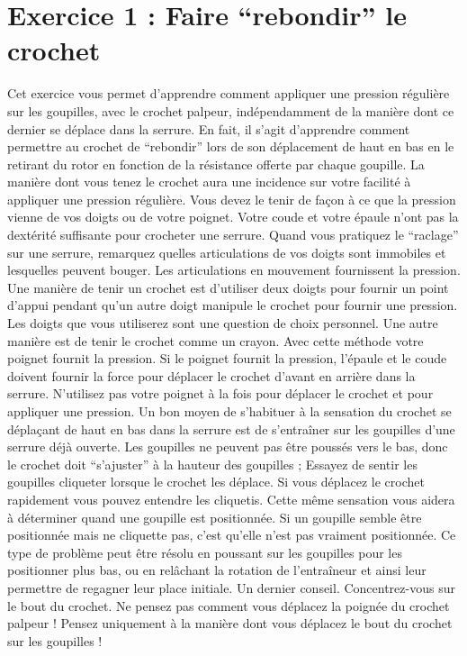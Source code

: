 \documentclass[a4paper,french,11pt,twoside]{report}
\begin{document}
\section{Exercice 1 : Faire \enquote{rebondir} le crochet}
Cet exercice vous permet d'apprendre comment appliquer une pression régulière sur les goupilles, avec le crochet palpeur, indépendamment de la manière dont ce dernier se déplace dans la serrure. En fait, il s'agit d'apprendre comment permettre au crochet de \enquote{rebondir} lors de son déplacement de haut en bas en le retirant du rotor en fonction de la résistance offerte par chaque goupille. La manière dont vous tenez le crochet aura une incidence sur votre facilité à appliquer une pression régulière. Vous devez le tenir de façon à ce que la pression vienne de vos doigts ou de votre poignet. Votre coude et votre épaule n'ont pas la dextérité suffisante pour crocheter une serrure. Quand vous pratiquez le \enquote{raclage} sur une serrure, remarquez quelles articulations de vos doigts sont immobiles et lesquelles peuvent bouger. Les articulations en mouvement fournissent la pression.
Une manière de tenir un crochet est d'utiliser deux doigts pour fournir un point d'appui pendant qu'un autre doigt manipule le crochet pour fournir une pression. Les doigts que vous utiliserez sont une question de choix personnel. Une autre manière est de tenir le crochet comme un crayon. Avec cette méthode votre poignet fournit la pression. Si le poignet fournit la pression, l'épaule et le coude doivent fournir la force pour déplacer le crochet d'avant en arrière dans la serrure. N'utilisez pas votre poignet à la fois pour déplacer le crochet et pour appliquer une pression.
Un bon moyen de s'habituer à la sensation du crochet se déplaçant de haut en bas dans la serrure est de s'entraîner sur les goupilles d'une serrure déjà ouverte. Les goupilles ne peuvent pas être poussés vers le bas, donc le crochet doit \enquote{s'ajuster} à la hauteur des goupilles ; Essayez de sentir les goupilles cliqueter lorsque le crochet les déplace. Si vous déplacez le crochet rapidement vous pouvez entendre les cliquetis. Cette même sensation vous aidera à déterminer quand une goupille est positionnée. Si un goupille semble être positionnée mais ne cliquette pas, c'est qu'elle n'est pas vraiment positionnée. Ce type de problème peut être résolu en poussant sur les goupilles pour les positionner plus bas, ou en relâchant la rotation de l'entraîneur et ainsi leur permettre de regagner leur place initiale.
Un dernier conseil. Concentrez-vous sur le bout du crochet. Ne pensez pas comment vous déplacez la poignée du crochet palpeur ! Pensez uniquement à la manière dont vous déplacez le bout du crochet sur les goupilles !
\end{document}

